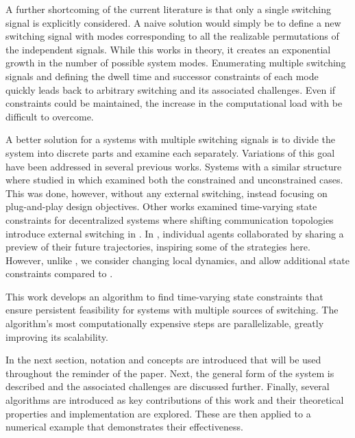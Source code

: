A further shortcoming of the current literature is that only a single switching signal is explicitly considered. A naive solution would simply be to define a new switching signal with modes corresponding to all the realizable permutations of the independent signals. While this works in theory, it creates an exponential growth in the number of possible system modes. Enumerating multiple switching signals and defining the dwell time and successor constraints of each mode quickly leads back to arbitrary switching and its associated challenges. Even if constraints could be maintained, the increase in the computational load with be difficult to overcome. 

A better solution for a systems with multiple switching signals is to divide the system into discrete parts and examine each separately. Variations of this goal have been addressed in several previous works. Systems with a similar structure where studied in \cite{Riverso2015} which examined both the constrained and unconstrained cases. This was done, however, without any external switching, instead focusing on plug-and-play design objectives. Other works examined time-varying state constraints for decentralized systems where shifting communication topologies introduce external switching in \cite{Ahandani2020, Li2020}. In \cite{Li2020}, individual agents collaborated by sharing a preview of their future trajectories, inspiring some of the strategies here. However, unlike \cite{Ahandani2020, Li2020}, we consider changing local dynamics, and allow additional state constraints compared to \cite{Li2020}.


This work develops an algorithm to find time-varying state constraints that ensure persistent feasibility for systems with multiple sources of switching. The algorithm's most computationally expensive steps are parallelizable, greatly improving its scalability. 

In the next section, notation and concepts are introduced that will be used throughout the reminder of the paper. Next, the general form of the system is described and the associated challenges are discussed further. Finally, several algorithms are introduced as key contributions of this work and their theoretical properties and implementation are explored. These are then applied to a numerical example that demonstrates their effectiveness. 